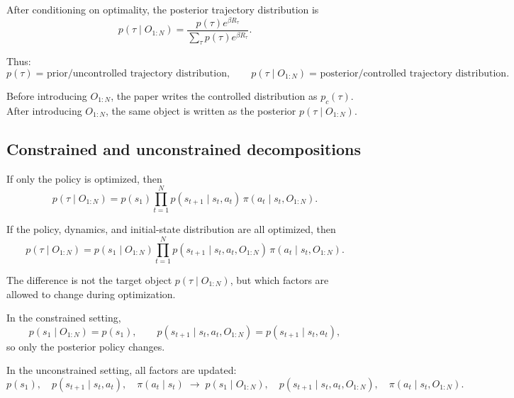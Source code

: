 \documentclass[11pt]{article}
\begin{document}
After conditioning on optimality, the posterior trajectory distribution is
\begin{equation}
    p(\tau\mid O_{1:N})
    = \frac{p(\tau)e^{\beta R_\tau}}{\sum_{\tau} p(\tau)e^{\beta R_\tau}}.
\end{equation}

Thus:
\begin{equation}
    p(\tau) \; \text{= prior/uncontrolled trajectory distribution},
    \qquad
    p(\tau\mid O_{1:N}) \; \text{= posterior/controlled trajectory distribution}.
\end{equation}

Before introducing \(O_{1:N}\), the paper writes the controlled distribution as \(p_c(\tau)\).
After introducing \(O_{1:N}\), the same object is written as the posterior
\(p(\tau\mid O_{1:N})\).

\subsection*{Constrained and unconstrained decompositions}

If only the policy is optimized, then
\begin{equation}
    p(\tau\mid O_{1:N})
    = p(s_1)\prod_{t=1}^{N} p(s_{t+1}\mid s_t,a_t)\,\pi(a_t\mid s_t,O_{1:N}).
\end{equation}

If the policy, dynamics, and initial-state distribution are all optimized, then
\begin{equation}
    p(\tau\mid O_{1:N})
    = p(s_1\mid O_{1:N})
    \prod_{t=1}^{N} p(s_{t+1}\mid s_t,a_t,O_{1:N})\,\pi(a_t\mid s_t,O_{1:N}).
\end{equation}

The difference is not the target object \(p(\tau\mid O_{1:N})\), but which factors are
allowed to change during optimization.

In the constrained setting,
\begin{equation}
    p(s_1\mid O_{1:N}) = p(s_1),
    \qquad
    p(s_{t+1}\mid s_t,a_t,O_{1:N}) = p(s_{t+1}\mid s_t,a_t),
\end{equation}
so only the posterior policy changes.

In the unconstrained setting, all factors are updated:
\begin{equation}
    p(s_1), \quad p(s_{t+1}\mid s_t,a_t), \quad \pi(a_t\mid s_t)
    \;\longrightarrow\;
    p(s_1\mid O_{1:N}), \quad p(s_{t+1}\mid s_t,a_t,O_{1:N}), \quad \pi(a_t\mid s_t,O_{1:N}).
\end{equation}
\end{document}
